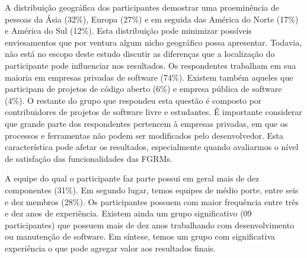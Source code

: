 A distribuição geográfica dos participantes demostrar uma proeminência de
pessoas da Ásia (32\%), Europa (27\%) e em seguida das América do Norte (17\%) e
América do Sul (12\%). Esta distribuição pode minimizar possíveis enviesamentos
que por ventura algum nicho geográfico possa apresentar. Todavia, não está no
escopo deste estudo discutir as diferenças que a localização do participante
pode influenciar nos resultados. Os respondentes trabalham em sua maioria em
empresas privadas de software (74\%). Existem também aqueles que participam de
projetos de código aberto (6\%) e empresa pública de software (4\%). O restante
do grupo que respondeu esta questão é composto por contribuidores de projetos de
software livre e estudantes. É importante considerar que grande parte dos
respondentes pertencem à empresas privadas, em que os processos e ferramentas não
podem ser modificados pelo desenvolvedor. Esta característica pode afetar os
resultados, especialmente quando avaliarmos o nível de satisfação das
funcionalidades das FGRMs.




A equipe do qual o participante faz parte possui em geral mais de dez
componentes (31\%). Em segundo lugar, temos equipes de médio porte, entre seis e
dez membros (28\%). Os participantes possuem com maior frequência entre três e
dez anos de experiência. Existem ainda um grupo significativo (09 participantes)
que possuem mais de dez anos trabalhando com desenvolvimento ou manutenção de
software. Em síntese, temos um grupo com significativa experiência o que pode
agregar valor aos resultados finais.


